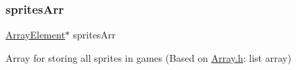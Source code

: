 \mbox{\label{group___library_merger_gaff9189abc1a89e6f7704d68d1de9f5ca}} 
\subsubsection{\texorpdfstring{sprites\+Arr}{spritesArr}}
{\footnotesize\ttfamily \hyperlink{_array_8h_a2e42efa76d727b8eb3084aac5baf2292}{Array\+Element}$\ast$ sprites\+Arr}



Array for storing all sprites in games (Based on \hyperlink{_array_8h}{Array.\+h}\+: list array) 

